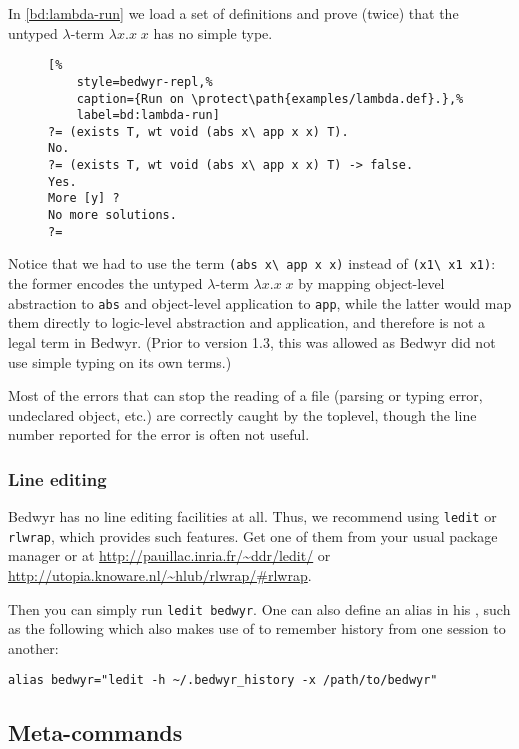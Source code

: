 In \autoref{bd:lambda-run} we load a set of definitions and prove
(twice) that the untyped $\lambda$-term $\lambda x.x\;x$ has no simple
type.

\begin{figure}
  \centering
  \begin{lstlisting}[%
    style=bedwyr-repl,%
    caption={Run on \protect\path{examples/lambda.def}.},%
    label=bd:lambda-run]
?= (exists T, wt void (abs x\ app x x) T).
No.
?= (exists T, wt void (abs x\ app x x) T) -> false.
Yes.
More [y] ?
No more solutions.
?=
  \end{lstlisting}
\end{figure}

Notice that we had to use the term \lstinline{(abs x\ app x x)} instead
of \lstinline{(x1\ x1 x1)}: the former encodes the untyped
$\lambda$-term $\lambda x.x\;x$ by mapping object-level abstraction to
\lstinline{abs} and object-level application to \lstinline{app}, while
the latter would map them directly to logic-level abstraction and
application, and therefore is not a legal term in Bedwyr.  (Prior to
version 1.3, this was allowed as Bedwyr did not use simple typing on its
own terms.)

Most of the errors that can stop the reading of a file (parsing or
typing error, undeclared object, etc.) are correctly caught by the
toplevel, though the line number reported for the error is often not
useful.

\subsubsection{Line editing}

Bedwyr has no line editing facilities at all. Thus, we recommend using
\verb|ledit| or \verb|rlwrap|, which provides such features. Get one
of them from your usual package manager or at
\url{http://pauillac.inria.fr/~ddr/ledit/} or
\url{http://utopia.knoware.nl/~hlub/rlwrap/#rlwrap}.

Then you can simply run \verb.ledit bedwyr.. One can also define an
alias in his , such as the following which also makes use
of  to remember history from one session to
another:
\begin{verbatim}
alias bedwyr="ledit -h ~/.bedwyr_history -x /path/to/bedwyr"
\end{verbatim}

\subsection{Meta-commands}

